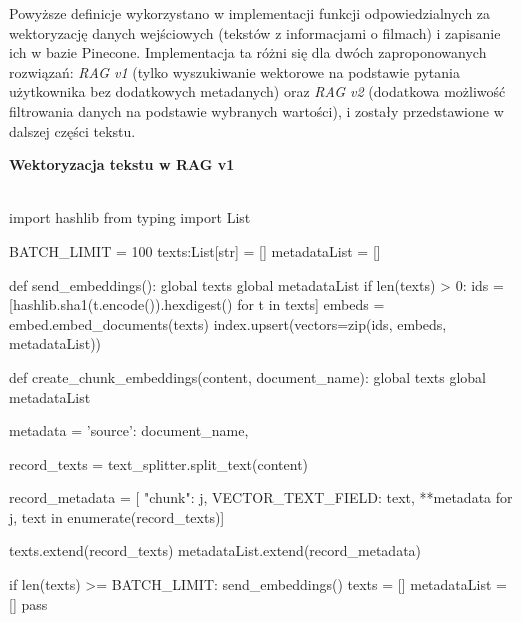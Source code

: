 \documentclass[
a4paper,
12pt,
]{article}
\begin{document}
\noindent{}Powyższe definicje wykorzystano w implementacji funkcji odpowiedzialnych za wektoryzację danych wejściowych (tekstów z informacjami o filmach) i zapisanie ich w bazie Pinecone. Implementacja ta różni się dla dwóch zaproponowanych rozwiązań: \textit{RAG v1} (tylko wyszukiwanie wektorowe na podstawie pytania użytkownika bez dodatkowych metadanych) oraz \textit{RAG v2} (dodatkowa możliwość filtrowania danych na podstawie wybranych wartości), i zostały przedstawione w dalszej części tekstu. 
\newline\null

\noindent\textbf{Wektoryzacja tekstu w RAG v1}

\begin{python}\\
import hashlib
from typing import List

BATCH_LIMIT = 100
texts:List[str] = []
metadataList = []

def send_embeddings():
    global texts
    global metadataList
    if len(texts) > 0:
        ids = [hashlib.sha1(t.encode()).hexdigest() for t in texts]
        embeds = embed.embed_documents(texts)
        index.upsert(vectors=zip(ids, embeds, metadataList))

def create_chunk_embeddings(content, document_name):
    global texts
    global metadataList
    
    metadata = {
        'source': document_name,
    }
    
    record_texts = text_splitter.split_text(content)
    
    record_metadata = [{
        "chunk": j, VECTOR_TEXT_FIELD: text, **metadata
    } for j, text in enumerate(record_texts)]
    
    texts.extend(record_texts)
    metadataList.extend(record_metadata)
    
    if len(texts) >= BATCH_LIMIT:
        send_embeddings()
        texts = []
        metadataList = []
    pass
\end{python}
\end{document}
